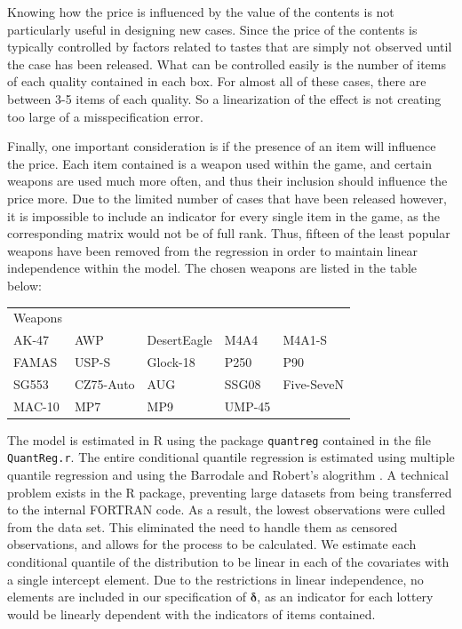 \documentclass[12pt, letterpaper]{paper}
\begin{document}
Knowing how the price is influenced by the value of the
contents is not particularly useful in designing new cases. Since the
price of the contents is typically controlled by factors related to
tastes that are simply not observed until the case has been
released. What can be controlled easily is the number of items of each
quality contained in each box. For almost all of these cases, there
are between 3-5 items of each quality. So a linearization of the
effect is not creating too large of a misspecification error.

Finally, one important consideration is if the presence of an item will
influence the price. Each item contained is a weapon used within the
game, and certain weapons are used much more often, and thus their
inclusion should influence the price more. Due to the limited
number of cases that have been released however, it is impossible to include
an indicator for every single item in the game, as the corresponding
matrix would not be of full rank. Thus, fifteen of the least popular
weapons have been removed from the regression in order to maintain
linear independence within the model. The chosen weapons are listed in
the table below:

\begin{center}
\begin{tabular}{lllll}
Weapons &  &  &  & \\
AK-47 & AWP & DesertEagle & M4A4 & M4A1-S\\
FAMAS & USP-S & Glock-18 & P250 & P90\\
SG553 & CZ75-Auto & AUG & SSG08 & Five-SeveN\\
MAC-10 & MP7 & MP9 & UMP-45 & \\
\end{tabular}
\end{center}

The model is estimated in R using the package \texttt{quantreg} \cite{quantreg}
contained in the file \texttt{QuantReg.r}. The entire conditional quantile
regression is estimated using multiple quantile regression and using
the Barrodale and Robert's alogrithm \cite{10.2307/3532912}. A technical
problem exists in the R package, preventing large datasets from being
transferred to the internal FORTRAN code. As a result, the lowest
observations were culled from the data set. This eliminated the need
to handle them as censored observations, and allows for the process to
be calculated. We estimate each conditional quantile of the
distribution to be linear in each of the covariates with a single
intercept element. Due to the restrictions in linear independence, no
elements are included in our specification of $\bm{\delta}$, as an
indicator for each lottery would be linearly dependent with the
indicators of items contained.
\end{document}
